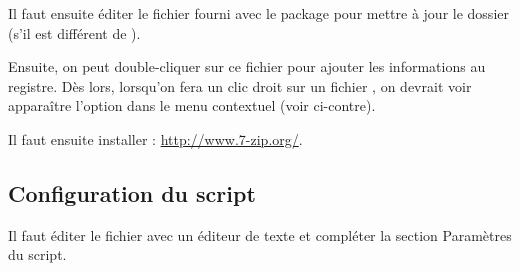 \documentclass[11pt]{article}
\begin{document}
Il faut ensuite éditer le fichier  fourni avec le package pour mettre à jour le dossier (s'il est différent de ).

Ensuite, on peut double-cliquer sur ce fichier pour ajouter les informations au registre. Dès lors, lorsqu'on fera un clic droit sur un fichier , on devrait voir apparaître l'option  dans le menu contextuel (voir ci-contre).

Il faut ensuite installer : \href{http://www.7-zip.org/}{http://www.7-zip.org/}.

\subsection{Configuration du script}
Il faut éditer le fichier  avec un éditeur de texte et compléter la section \og Paramètres du script\fg{}.
\end{document}

